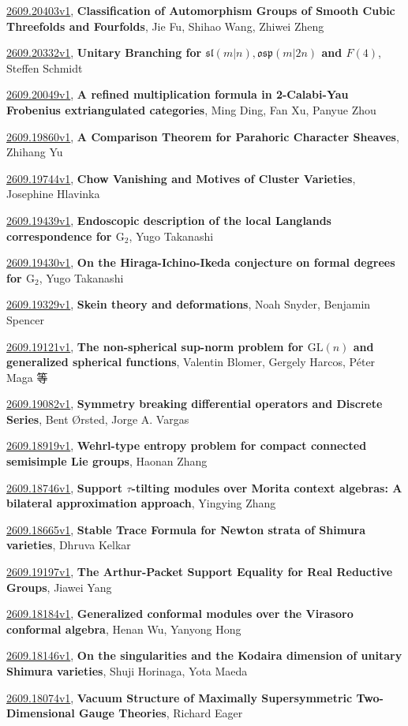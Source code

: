 \documentclass[9pt, a4paper]{article}
\theoremstyle{plain}
\theoremstyle{definition}
\theoremstyle{remark}
\newcommand{\arxiv}[3]{\href{https://arxiv.org/abs/#1}{#1}, \textbf{\textcolor{arxivblue}{#2}}, #3}
\begin{document}
\arxiv{2609.20403v1}{Classification of Automorphism Groups of Smooth Cubic Threefolds and Fourfolds}{Jie Fu, Shihao Wang, Zhiwei Zheng}

\arxiv{2609.20332v1}{Unitary Branching for $\mathfrak{sl}(m\vert n), \mathfrak{osp}(m\vert 2n)$ and $F(4)$}{Steffen Schmidt}

\arxiv{2609.20049v1}{A refined multiplication formula in 2-Calabi-Yau Frobenius extriangulated categories}{Ming Ding, Fan Xu, Panyue Zhou}

\arxiv{2609.19860v1}{A Comparison Theorem for Parahoric Character Sheaves}{Zhihang Yu}

\arxiv{2609.19744v1}{Chow Vanishing and Motives of Cluster Varieties}{Josephine Hlavinka}

\arxiv{2609.19439v1}{Endoscopic description of the local Langlands correspondence for $\mathrm{G}_2$}{Yugo Takanashi}

\arxiv{2609.19430v1}{On the Hiraga-Ichino-Ikeda conjecture on formal degrees for $\mathrm{G_2}$}{Yugo Takanashi}

\arxiv{2609.19329v1}{Skein theory and deformations}{Noah Snyder, Benjamin Spencer}

\arxiv{2609.19121v1}{The non-spherical sup-norm problem for $\mathrm{GL}(n)$ and generalized spherical functions}{Valentin Blomer, Gergely Harcos, Péter Maga 等}

\arxiv{2609.19082v1}{Symmetry breaking differential operators and Discrete Series}{Bent Ørsted, Jorge A. Vargas}

\arxiv{2609.18919v1}{Wehrl-type entropy problem for compact connected semisimple Lie groups}{Haonan Zhang}

\arxiv{2609.18746v1}{Support $τ$-tilting modules over Morita context algebras: A bilateral approximation approach}{Yingying Zhang}

\arxiv{2609.18665v1}{Stable Trace Formula for Newton strata of Shimura varieties}{Dhruva Kelkar}

\arxiv{2609.19197v1}{The Arthur-Packet Support Equality for Real Reductive Groups}{Jiawei Yang}

\arxiv{2609.18184v1}{Generalized conformal modules over the Virasoro conformal algebra}{Henan Wu, Yanyong Hong}

\arxiv{2609.18146v1}{On the singularities and the Kodaira dimension of unitary Shimura varieties}{Shuji Horinaga, Yota Maeda}

\arxiv{2609.18074v1}{Vacuum Structure of Maximally Supersymmetric Two-Dimensional Gauge Theories}{Richard Eager}
\end{document}
